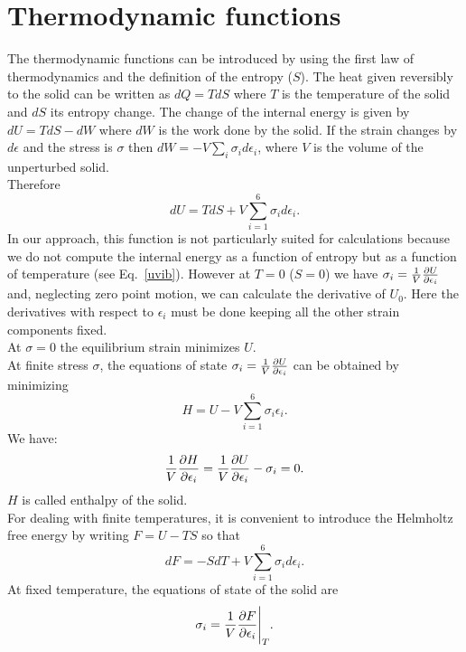\documentclass[12pt,a4paper]{article}
\begin{document}
\newpage
\section{\color{coral}Thermodynamic functions}

The thermodynamic functions can be introduced by using the first law
of thermodynamics and the definition of the entropy ($S$). The heat 
given reversibly to the solid can be written as $dQ=TdS$ where $T$ is
the temperature of the solid and $dS$ its entropy change. The change 
of the internal energy is given by $dU = TdS - dW$ where $dW$ is 
the work done by the solid. If the strain changes by $d\epsilon$ and 
the stress is $\sigma$ then $dW=-V \sum_i \sigma_i d\epsilon_i$, where $V$
is the volume of the unperturbed solid. \\
Therefore
\begin{equation}
dU=TdS + V \sum_{i=1}^6 \sigma_i d\epsilon_i.
\end{equation}
In our approach, this function is not particularly suited for 
calculations because we do not compute the internal energy as a function 
of entropy but as a function of temperature (see Eq.~\ref{uvib}). However
at $T=0$ ($S=0$) we have $\sigma_i={1 \over V} 
{\partial U \over \partial \epsilon_i}$ and, neglecting zero point motion,
we can calculate the derivative of $U_0$. 
Here the derivatives with 
respect to $\epsilon_i$ must be done keeping all the other strain 
components fixed. \\
At $\sigma=0$ the equilibrium strain minimizes $U$. \\ 
At finite stress $\sigma$, 
the equations of state $\sigma_i ={1\over V} 
{\partial U \over \partial \epsilon_i}$
can be obtained by minimizing
\begin{equation}
H= U - V \sum_{i=1}^6 \sigma_i \epsilon_i.
\end{equation}
We have:
\begin{equation}
{1\over V }{\partial H \over \partial \epsilon_i} = {1\over V} 
{\partial U \over \partial \epsilon_i}- 
\sigma_i = 0.
\end{equation}
$H$ is called enthalpy of the solid. \\
For dealing with finite temperatures, it is convenient to introduce the 
Helmholtz free energy by writing $F=U-TS$ so that
\begin{equation}
dF=-S dT + V \sum_{i=1}^6 \sigma_i d\epsilon_i.
\end{equation}
At fixed temperature, the equations of state of the solid are
\begin{equation}
\sigma_i= {1\over V }{\partial F \over \partial \epsilon_i}\Bigg|_T.
\end{equation}
\end{document}
